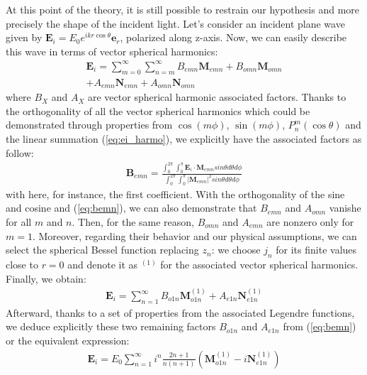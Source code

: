 \documentclass{article}
\numberwithin{equation}{section}
\begin{document}
At this point of the theory, it is still possible to restrain our hypothesis and more precisely the shape of the incident light. Let's consider an incident plane wave given by $\textbf{E}_{i}=E_{0}e^{ikr\cos\theta}\textbf{e}_{r}$, polarized along z-axis. Now, we can easily describe this wave in terms of vector spherical harmonics:
\begin{equation}\label{eq:ei_harmo}
\begin{aligned}
\textbf{E}_{i}=\sum_{m=0}^{\infty }\sum_{n=m}^{\infty }B_{emn}\textbf{M}_{emn}+B_{omn}\textbf{M}_{omn}\\
+A_{emn}\textbf{N}_{emn}+A_{omn}\textbf{N}_{omn}
\end{aligned}
\end{equation}
where $B_{X}$ and $A_{X}$ are vector spherical harmonic associated factors. Thanks to the orthogonality of all the vector spherical harmonics which could be demonstrated through properties from $\cos(m\phi)$, $\sin(m\phi)$, $P_{n}^{m}(\cos\theta)$ and the linear summation (\ref{eq:ei_harmo}), we explicitly have the associated factors as follow:
\begin{align}\label{eq:bemn}
\textbf{B}_{emn}=\frac{\int_{0}^{2\pi}\int_{0}^{\pi}\textbf{E}_{i}\cdot \textbf{M}_{emn}sin\theta d\theta d\phi}{\int_{0}^{2\pi}\int_{0}^{\pi}|\textbf{M}_{emn}|^{2}sin\theta d\theta d\phi}
\end{align}
with here, for instance, the first coefficient. With the orthogonality of the sine and cosine and (\ref{eq:bemn}), we can also demonstrate that $B_{emn}$ and $A_{omn}$ vanishe for all $m$ and $n$. Then, for the same reason, $B_{omn}$ and $A_{emn}$ are nonzero only for $m=1$. Moreover, regarding their behavior and our physical assumptions, we can select the spherical Bessel function replacing $z_{n}$: we choose $j_{n}$ for its finite values close to $r=0$ and denote it as $^{(1)}$ for the associated vector spherical harmonics. Finally, we obtain:
\begin{align}
\textbf{E}_{i}=\sum_{n=1}^{\infty }B_{o1n}\textbf{M}^{(1)}_{o1n} + A_{e1n}\textbf{N}^{(1)}_{e1n}
\end{align}
Afterward, thanks to a set of properties from the associated Legendre functions, we deduce explicitly these two remaining factors $B_{o1n}$ and $A_{e1n}$ from (\ref{eq:bemn}) or the equivalent expression:
\begin{align}
\textbf{E}_{i}=E_{0}\sum_{n=1}^{\infty }i^{n}\frac{2n+1}{n(n+1)}(\textbf{M}^{(1)}_{o1n} - i\textbf{N}^{(1)}_{e1n})
\end{align}
\end{document}
